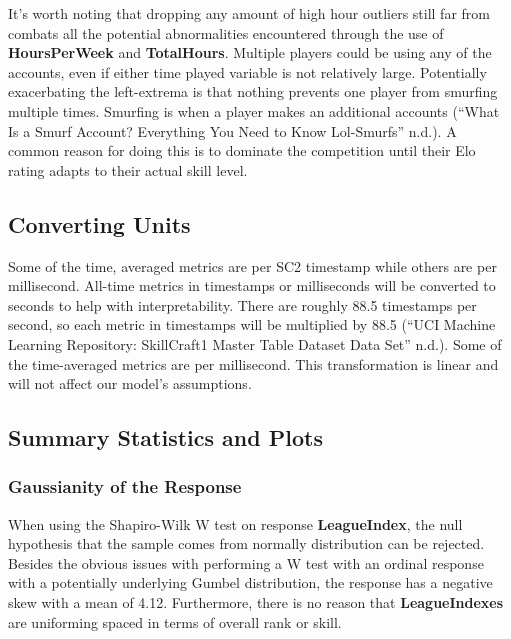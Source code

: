 \documentclass[]{article}
\begin{document}
It's worth noting that dropping any amount of high hour outliers still
far from combats all the potential abnormalities encountered through the
use of \textbf{HoursPerWeek} and \textbf{TotalHours}. Multiple players
could be using any of the accounts, even if either time played variable
is not relatively large. Potentially exacerbating the left-extrema is
that nothing prevents one player from smurfing multiple times. Smurfing
is when a player makes an additional accounts (``What Is a Smurf
Account? Everything You Need to Know \textbar{} Lol-Smurfs'' n.d.). A
common reason for doing this is to dominate the competition until their
Elo rating adapts to their actual skill level.

\hypertarget{converting-units}{%
\subsection{Converting Units}\label{converting-units}}

Some of the time, averaged metrics are per SC2 timestamp while others
are per millisecond. All-time metrics in timestamps or milliseconds will
be converted to seconds to help with interpretability. There are roughly
88.5 timestamps per second, so each metric in timestamps will be
multiplied by 88.5 (``UCI Machine Learning Repository: SkillCraft1
Master Table Dataset Data Set'' n.d.). Some of the time-averaged metrics
are per millisecond. This transformation is linear and will not affect
our model's assumptions.

\hypertarget{summary-statistics-and-plots}{%
\subsection{Summary Statistics and
Plots}\label{summary-statistics-and-plots}}

\hypertarget{gaussianity-of-the-response}{%
\subsubsection{Gaussianity of the
Response}\label{gaussianity-of-the-response}}

When using the Shapiro-Wilk W test on response \textbf{LeagueIndex}, the
null hypothesis that the sample comes from normally distribution can be
rejected. Besides the obvious issues with performing a W test with an
ordinal response with a potentially underlying Gumbel distribution, the
response has a negative skew with a mean of 4.12. Furthermore, there is
no reason that \textbf{LeagueIndexes} are uniforming spaced in terms of
overall rank or skill.
\end{document}

